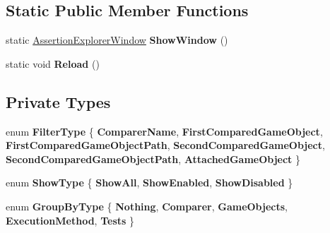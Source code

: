 \subsection*{Static Public Member Functions}
\begin{DoxyCompactItemize}
\item 
\mbox{\label{class_unity_test_1_1_assertion_explorer_window_a81bd8d16e37474fa099373cc8b45e04e}} 
static \hyperlink{class_unity_test_1_1_assertion_explorer_window}{Assertion\+Explorer\+Window} {\bfseries Show\+Window} ()
\item 
\mbox{\label{class_unity_test_1_1_assertion_explorer_window_aba035e2fad3f5f0d128bbf414a3d74a0}} 
static void {\bfseries Reload} ()
\end{DoxyCompactItemize}
\subsection*{Private Types}
\begin{DoxyCompactItemize}
\item 
\mbox{\label{class_unity_test_1_1_assertion_explorer_window_adc03aaf521564554c58c00d7719249dc}} 
enum {\bfseries Filter\+Type} \{ \newline
{\bfseries Comparer\+Name}, 
{\bfseries First\+Compared\+Game\+Object}, 
{\bfseries First\+Compared\+Game\+Object\+Path}, 
{\bfseries Second\+Compared\+Game\+Object}, 
\newline
{\bfseries Second\+Compared\+Game\+Object\+Path}, 
{\bfseries Attached\+Game\+Object}
 \}
\item 
\mbox{\label{class_unity_test_1_1_assertion_explorer_window_a0ffae235d6b938eac1ad02c16795526d}} 
enum {\bfseries Show\+Type} \{ {\bfseries Show\+All}, 
{\bfseries Show\+Enabled}, 
{\bfseries Show\+Disabled}
 \}
\item 
\mbox{\label{class_unity_test_1_1_assertion_explorer_window_a1adea2f333884f239f6b78204b637b68}} 
enum {\bfseries Group\+By\+Type} \{ \newline
{\bfseries Nothing}, 
{\bfseries Comparer}, 
{\bfseries Game\+Objects}, 
{\bfseries Execution\+Method}, 
\newline
{\bfseries Tests}
 \}
\end{DoxyCompactItemize}
